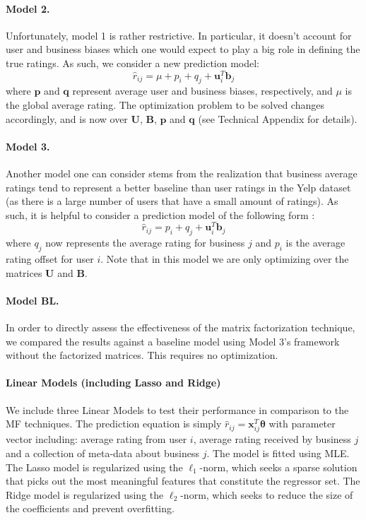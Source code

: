 \documentclass[12pt]{article}
\newcommand{\mbf}[1]{\mathbf{#1}}
\begin{document}
\paragraph{Model 2.} Unfortunately, model 1 is rather restrictive. In particular, it doesn't account for user and business biases which one would expect to play a big role in defining the true ratings. As such, we consider a new prediction model:
\begin{equation}
\hat r_{ij} = \mu + p_i + q_j + \mbf u_i^T\mbf b_j
\end{equation}
where $\mbf p$ and $\mbf q$ represent average user and business biases, respectively, and $\mu$ is the global average rating. The optimization problem to be solved changes accordingly, and is now over $\mbf U$, $\mbf B$, $\mbf p$ and $\mbf q$ (see Technical Appendix for details).

\paragraph{Model 3.} Another model one can consider stems from the realization that business average ratings tend to represent a better baseline than user ratings in the Yelp dataset (as there is a large number of users that have a small amount of ratings). As such, it is helpful to consider a prediction model of the following form \cite{funk06}:
\begin{equation}
\hat r_{ij} =  p_i + q_j + \mbf u_i^T\mbf b_j
\end{equation}
where $q_j$ now represents the average rating for business $j$ and $p_i$ is the average rating offset for user $i$. Note that in this model we are only optimizing over the matrices $\mbf U$ and $\mbf B$. 

\paragraph{Model BL.} In order to directly assess the effectiveness of the matrix factorization technique, we compared the results against a baseline model using Model 3's framework without the factorized matrices. This requires no optimization.

\paragraph{Linear Models (including Lasso and Ridge)} We include three Linear Models to test their performance in comparison to the MF techniques. The prediction equation is simply $\hat r_{ij}=\mbf x_{ij}^T\boldsymbol\theta$ with parameter vector including: average rating from user $i$, average rating received by business $j$ and a collection of meta-data about business $j$. The model is fitted using MLE. The Lasso model is regularized using the $\ell_1$-norm, which seeks a sparse solution that picks out the most meaningful features that constitute the regressor set. The Ridge model is regularized using the $\ell_2$-norm, which seeks to reduce the size of the coefficients and prevent overfitting.
\end{document}

